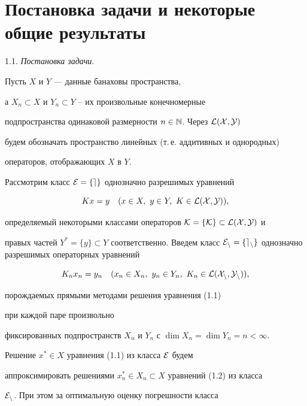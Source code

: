 \section{Постановка задачи и некоторые общие результаты}





1.1. {\it Постановка задачи}.


Пусть $X$ и $Y$ --- данные банаховы пространства,


а $X_n\subset X$ и $Y_n \subset Y$ -- их произвольные конечномерные


подпространства одинаковой размерности $n\in \Bbb N$. Через $\cal L(X, Y)$


будем обозначать пространство линейных (т.\,е. аддитивных и однородных)


операторов, отображающих $X$ в $Y$.





Рассмотрим класс $\cal E=\{ e\}$ однозначно разрешимых уравнений


\begin{equation}


Kx=y\quad (x\in X,\ y\in Y,\ K\in \cal L(X,Y)),


\end{equation}


определяемый некоторыми классами операторов $\cal K=\{ K\}\subset L(X,Y)$ и


правых частей $Y^*=\{ y\}\subset Y$ соответственно. Введем класс $\cal E_n


=\{ e_n\}$ однозначно разрешимых операторных уравнений


\begin{equation}


K_nx_n=y_n\quad (x_n\in X_n,\ y_n\in Y_n,\ K_n\in \cal L(X_n,Y_n)),


\end{equation}


порождаемых прямыми методами решения уравнения (1.1)


при каждой паре произвольно


фиксированных подпространств $X_n$ и $Y_n$ с $\dim X_n=\dim Y_n=n<\infty$.


Решение $x^*\in X$ уравнения (1.1) из класса $\cal E$ будем


аппроксимировать решениями $x_n^*\in X_n\subset X$ уравнений (1.2) из класса


$\cal E_n$. При этом за оптимальную оценку погрешности класса


